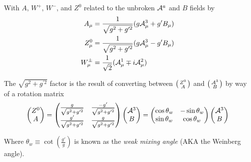     With $A$, $W^+$, $W^-$, and $Z^0$ related to the unbroken $\mathcal{A}^a$ and $B$ fields by
    \begin{equation} \begin{split}
        A_{\mu} & = \frac{1}{\sqrt{g^2 + g^{\prime 2}}} ( g\mathcal{A}^3_{\mu} + g'B_{\mu} ) \\
        Z^0_{\mu} & = \frac{1}{\sqrt{g^2 + g^{\prime 2}}} ( g\mathcal{A}^3_{\mu} - g'B_{\mu} ) \\
        W^{\pm}_{\mu} & = \frac{1}{\sqrt{2}} (\mathcal{A}^1_{\mu} \mp i\mathcal{A}^2_{\mu})
    \end{split} \end{equation}

    The $\sqrt{g^2 + g^{\prime 2}}$ factor is the result of converting between
        $\big(\begin{smallmatrix} Z^0 \\ A \end{smallmatrix}\big)$ and $\big(\begin{smallmatrix} \mathcal{A}^3 \\ B \end{smallmatrix}\big)$ by way of a rotation matrix
    \begin{equation} \begin{split}
        \begin{pmatrix} Z^0 \\ A \end{pmatrix} =
        \begin{pmatrix}
            \frac{g}{\sqrt{g^2 + g^{\prime 2}}} & \frac{-g'}{\sqrt{g^2 + g^{\prime 2}}} \\
            \frac{g'}{\sqrt{g^2 + g^{\prime 2}}} & \frac{g}{\sqrt{g^2 + g^{\prime 2}}}
        \end{pmatrix} \begin{pmatrix} \mathcal{A}^3 \\ B \end{pmatrix} = 
        \begin{pmatrix}
            \cos\theta_w & -\sin\theta_w \\
            \sin\theta_w & \cos\theta_w
        \end{pmatrix} \begin{pmatrix} \mathcal{A}^3 \\ B \end{pmatrix}
    \end{split} \end{equation}

    Where $\theta_w \equiv \cot(\frac{g'}{g})$ is known as the \textit{weak mixing angle} (AKA the Weinberg angle).

